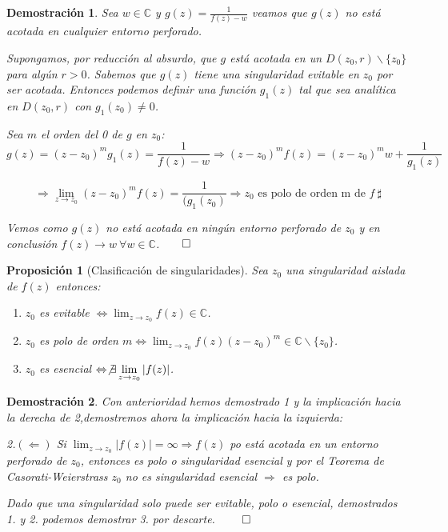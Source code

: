 \documentclass[12pt]{book}
\newtheorem{prop}{Proposición}[chapter]
\newtheorem*{dem}{Demostración}
\newcommand{\C}{\mathbb{C}}
\begin{document}
\begin{dem}
Sea $w\in\C$ y $g(z) = \frac{1}{f(z)-w}$ veamos que $g(z)$ no está acotada en cualquier entorno perforado.

Supongamos, por reducción al absurdo, que $g$ está acotada en un $D(z_0,r)\backslash\{z_0\}$ para algún $r>0$. Sabemos que $g(z)$ tiene una singularidad evitable en $z_0$ por ser acotada. Entonces podemos definir una función $g_1(z)$ tal que sea analítica en $D(z_0,r)$ con $g_1(z_0) \neq 0$.

Sea $m$ el orden del 0 de $g$ en $z_0$:
$$g(z) = (z-z_0)^m g_1(z) = \frac{1}{f(z)-w}\Rightarrow (z-z_0)^m f(z) = (z-z_0)^m w+\frac{1}{g_1(z)}$$

$$\Rightarrow \lim_{z\to z_0} (z-z_0)^m f(z) = \frac{1}{(g_1(z_0)}\Rightarrow z_0 \text{ es polo de orden m de } f\ \sharp$$

Vemos como $g(z)$ no está acotada en ningún entorno perforado de $z_0$ y en conclusión $f(z) \to w\ \forall w\in\C$.$\qed$
\end{dem}

\begin{prop}[Clasificación de singularidades]
Sea $z_0$ una singularidad aislada de $f(z)$ entonces:
\begin{enumerate}
\item $z_0$ es evitable $\displaystyle \Leftrightarrow \lim_{z\to z_0} f(z) \in\C$.
\item $z_0$ es polo de orden $\displaystyle m \Leftrightarrow \lim_{z\to z_0} f(z)(z-z_0)^m \in\C\backslash\{z_0\}$.
\item $z_0$ es esencial $\displaystyle \Leftrightarrow \not \exists \lim_{z\to z_0} |f(z)|$.
\end{enumerate}
\end{prop}

\begin{dem}
Con anterioridad hemos demostrado 1 y la implicación hacia la derecha de 2,demostremos ahora la implicación hacia la izquierda:

2.$(\Leftarrow)$ Si $\lim_{z\to z_0}|f(z)|= \infty \Rightarrow f(z)$ po está acotada en un entorno perforado de $z_0$, entonces es polo o singularidad esencial y por el Teorema de Casorati-Weierstrass $z_0$ no es singularidad esencial $\Rightarrow$ es polo.

Dado que una singularidad solo puede ser evitable, polo o esencial, demostrados 1. y 2. podemos demostrar 3. por descarte. $\qed$

\end{dem}
\end{document}
